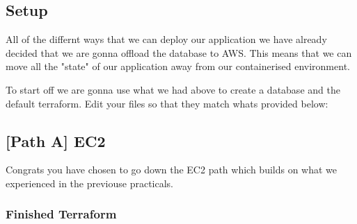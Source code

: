 \documentclass{csse4400}
\begin{document}
\subsection{Setup}

All of the differnt ways that we can deploy our application we have already decided that we are gonna offload the database to AWS. This means that we can move all the "state" of our application away from our containerised environment.

To start off we are gonna use what we had above to create a database and the default terraform. Edit your files so that they match whats provided below:



\subsection{[Path A] EC2}

Congrats you have chosen to go down the EC2 path which builds on what we experienced in the previouse practicals.


\subsubsection{Finished Terraform}
\end{document}
